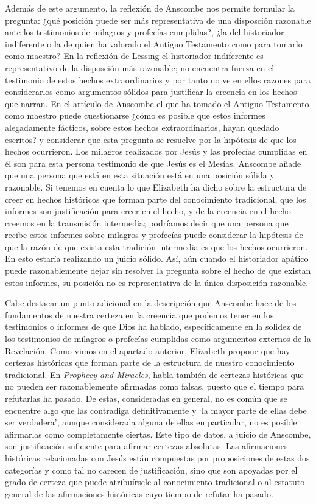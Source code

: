 Además de este argumento, la reflexión de Anscombe nos permite formular la pregunta: ¿qué posición puede ser más representativa de una disposción razonable ante los testimonios de milagros y profecías cumplidas?, ¿la del historiador indiferente o la de quien ha valorado el Antiguo Testamento como para tomarlo como maestro? En la reflexión de Lessing el historiador indiferente es representativo de la disposción más razonable; no encuentra fuerza en el testimonio de estos hechos extraordinarios y por tanto no ve en ellos razones para considerarlos como argumentos sólidos para justificar la creencia en los hechos que narran. En el artículo de Anscombe el que ha tomado el Antiguo Testamento como maestro puede cuestionarse ¿cómo es posible que estos informes alegadamente fácticos, sobre estos hechos extraordinarios, hayan quedado escritos? y considerar que esta pregunta se resuelve por la hipótesis de que los hechos ocurrieron. Los milagros realizados por Jesús y las profecías cumplidas en él son para esta persona testimonio de que Jesús es el Mesías. Anscombe añade que una persona que está en esta situación está en una posición sólida y razonable. Si tenemos en cuenta lo que Elizabeth ha dicho sobre la estructura de creer en hechos históricos que forman parte del conocimiento tradicional, que los informes son justificación para creer en el hecho, y de la creencia en el hecho creemos en la transmisión intermedia; podríamos decir que una persona que recibe estos informes sobre milagros y profecías puede considerar la hipótesis de que la razón de que exista esta tradición intermedia es que los hechos ocurrieron. En esto estaría realizando un juicio sólido. Así, aún cuando el historiador apático puede razonablemente dejar sin resolver la pregunta sobre el hecho de que existan estos informes, su posición no es representativa de la única disposición razonable.

Cabe destacar un punto adicional en la descripción que Anscombe hace de los fundamentos de nuestra certeza en la creencia que podemos tener en los testimonios o informes de que Dios ha hablado, específicamente en la solidez de los testimonios de milagros o profecías cumplidas como argumentos externos de la Revelación. Como vimos en el apartado anterior, Elizabeth propone que hay certezas históricas que forman parte de la estructura de nuestro conocimiento tradicional. En \emph{Prophecy and Miracles}, habla también de certezas históricas que no pueden ser razonablemente afirmadas como falsas, puesto que el tiempo para refutarlas ha pasado. De estas, consideradas en general, no es común que se encuentre algo que las contradiga definitivamente y \enquote*{la mayor parte de ellas debe ser verdadera}, aunque considerada alguna de ellas en particular, no es posible afirmarlas como completamente ciertas. Este tipo de datos, a juicio de Anscombe, son justificación suficiente para afirmar certezas absolutas. Las afirmaciones históricas relacionadas con Jesús están compuestas por proposiciones de estas dos categorías y como tal no carecen de justificación, sino que son apoyadas por el grado de certeza que puede atribuírsele al conocimiento tradicional o al estatuto general de las afirmaciones históricas cuyo tiempo de refutar ha pasado.

